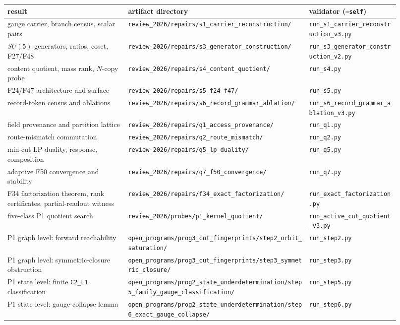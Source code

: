 \begin{center}
\small
\begin{longtable}[]{@{}p{0.29\linewidth}p{0.42\linewidth}p{0.21\linewidth}@{}}
\toprule
result & artifact directory & validator (\texttt{--self})\\
\midrule
\endhead
gauge carrier, branch census, scalar pairs &
\nolinkurl{review_2026/repairs/s1_carrier_reconstruction/} &
\nolinkurl{run_s1_carrier_reconstruction_v3.py}\\
\(SU(5)\) generators, ratios, coset, F27/F48 &
\nolinkurl{review_2026/repairs/s3_generator_construction/} &
\nolinkurl{run_s3_generator_construction_v2.py}\\
content quotient, mass rank, \(N\)-copy probe &
\nolinkurl{review_2026/repairs/s4_content_quotient/} &
\nolinkurl{run_s4.py}\\
F24/F47 architecture and surface &
\nolinkurl{review_2026/repairs/s5_f24_f47/} &
\nolinkurl{run_s5.py}\\
record-token census and ablations &
\nolinkurl{review_2026/repairs/s6_record_grammar_ablation/} &
\nolinkurl{run_s6_record_grammar_ablation_v3.py}\\
field provenance and partition lattice &
\nolinkurl{review_2026/repairs/q1_access_provenance/} &
\nolinkurl{run_q1.py}\\
route-mismatch commutation &
\nolinkurl{review_2026/repairs/q2_route_mismatch/} &
\nolinkurl{run_q2.py}\\
min-cut LP duality, response, composition &
\nolinkurl{review_2026/repairs/q5_lp_duality/} &
\nolinkurl{run_q5.py}\\
adaptive F50 convergence and stability &
\nolinkurl{review_2026/repairs/q7_f50_convergence/} &
\nolinkurl{run_q7.py}\\
F34 factorization theorem, rank certificates, partial-readout witness &
\nolinkurl{review_2026/repairs/f34_exact_factorization/} &
\nolinkurl{run_exact_factorization.py}\\
five-class P1 quotient search &
\nolinkurl{review_2026/probes/p1_kernel_quotient/} &
\nolinkurl{run_active_cut_quotient_v3.py}\\
P1 graph level: forward reachability &
\nolinkurl{open_programs/prog3_cut_fingerprints/step2_orbit_saturation/} &
\nolinkurl{run_step2.py}\\
P1 graph level: symmetric-closure obstruction &
\nolinkurl{open_programs/prog3_cut_fingerprints/step3_symmetric_closure/} &
\nolinkurl{run_step3.py}\\
P1 state level: finite \texttt{C2\_L1} classification &
\nolinkurl{open_programs/prog2_state_underdetermination/step5_family_gauge_classification/} &
\nolinkurl{run_step5.py}\\
P1 state level: gauge-collapse lemma &
\nolinkurl{open_programs/prog2_state_underdetermination/step6_exact_gauge_collapse/} &
\nolinkurl{run_step6.py}\\
\bottomrule
\end{longtable}
\end{center}

